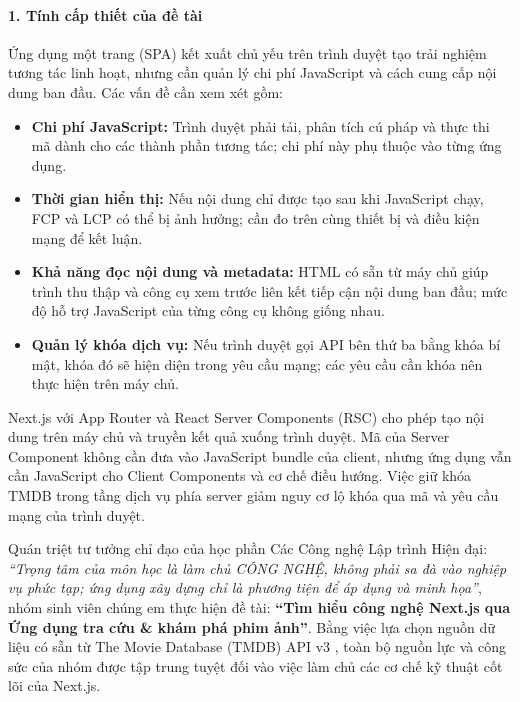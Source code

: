 \documentclass[12pt,a4paper]{extarticle}
\begin{document}
\paragraph*{1. Tính cấp thiết của đề tài}
Ứng dụng một trang (SPA) kết xuất chủ yếu trên trình duyệt tạo trải nghiệm tương tác linh hoạt, nhưng cần quản lý chi phí JavaScript và cách cung cấp nội dung ban đầu. Các vấn đề cần xem xét gồm:
\begin{itemize}[noitemsep]
    \item \textbf{Chi phí JavaScript:} Trình duyệt phải tải, phân tích cú pháp và thực thi mã dành cho các thành phần tương tác; chi phí này phụ thuộc vào từng ứng dụng.
    \item \textbf{Thời gian hiển thị:} Nếu nội dung chỉ được tạo sau khi JavaScript chạy, FCP và LCP có thể bị ảnh hưởng; cần đo trên cùng thiết bị và điều kiện mạng để kết luận.
    \item \textbf{Khả năng đọc nội dung và metadata:} HTML có sẵn từ máy chủ giúp trình thu thập và công cụ xem trước liên kết tiếp cận nội dung ban đầu; mức độ hỗ trợ JavaScript của từng công cụ không giống nhau.
    \item \textbf{Quản lý khóa dịch vụ:} Nếu trình duyệt gọi API bên thứ ba bằng khóa bí mật, khóa đó sẽ hiện diện trong yêu cầu mạng; các yêu cầu cần khóa nên thực hiện trên máy chủ.
\end{itemize}

Next.js \cite{nextjs_docs} với App Router và React Server Components (RSC) \cite{rsc_architecture} cho phép tạo nội dung trên máy chủ và truyền kết quả xuống trình duyệt. Mã của Server Component không cần đưa vào JavaScript bundle của client, nhưng ứng dụng vẫn cần JavaScript cho Client Components và cơ chế điều hướng. Việc giữ khóa TMDB trong tầng dịch vụ phía server giảm nguy cơ lộ khóa qua mã và yêu cầu mạng của trình duyệt.

Quán triệt tư tưởng chỉ đạo của học phần Các Công nghệ Lập trình Hiện đại: \textit{``Trọng tâm của môn học là làm chủ CÔNG NGHỆ, không phải sa đà vào nghiệp vụ phức tạp; ứng dụng xây dựng chỉ là phương tiện để áp dụng và minh họa''}, nhóm sinh viên chúng em thực hiện đề tài: \textbf{``Tìm hiểu công nghệ Next.js qua Ứng dụng tra cứu \& khám phá phim ảnh''}. Bằng việc lựa chọn nguồn dữ liệu có sẵn từ The Movie Database (TMDB) API v3 \cite{tmdb_api}, toàn bộ nguồn lực và công sức của nhóm được tập trung tuyệt đối vào việc làm chủ các cơ chế kỹ thuật cốt lõi của Next.js.
\end{document}
